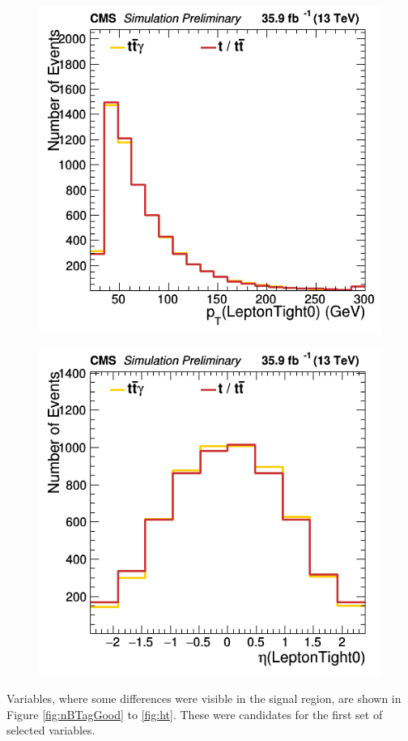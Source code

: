 \documentclass[11pt]{scrartcl}
\begin{document}
\begin{figure}[H]
\centering
\begin{minipage}{.5\textwidth}
  \centering
  \includegraphics[width=0.75\linewidth]{figures/Notused/LeptonTight0_pt.png}
  \label{fig:LeptonTight0pt}
\end{minipage}%
\begin{minipage}{.5\textwidth}
  \centering
  \includegraphics[width=0.75\linewidth]{figures/Notused/LeptonTight0_eta.png}
  \label{fig:LeptonTight0eta}
\end{minipage}
\end{figure}

Variables, where some differences were visible in the signal region, are shown in Figure \ref{fig:nBTagGood} to \ref{fig:ht}. These were candidates for the first set of selected variables. 
\end{document}
